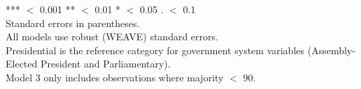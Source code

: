 \documentclass[a4paper]{article}\usepackage{graphicx, color}
\begin{document}
\begin{landscape}
\begin{table}
{{}}
{\scriptsize{
	{*}{*}{*} $<$ 0.001 {*}{*} $<$ 0.01 {*} $<$ 0.05 {.} $<$ 0.1 \\
	Standard errors in parentheses. \\
	All models use robust (WEAVE) standard errors. \\
	Presidential is the reference category for government system variables (Assembly-Elected President and Parliamentary). \\
	Model 3 only includes observations where majority $<$ 90.
}}
\end{table}
\end{landscape}

\end{document}
